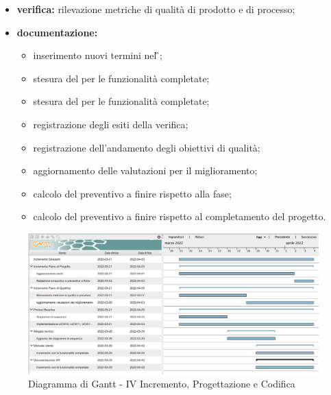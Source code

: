 \begin{itemize}
 	\item \textbf{verifica:} rilevazione metriche di qualità di prodotto e di processo;
	\item \textbf{documentazione:} 
	 \begin{itemize}
		\item inserimento nuovi termini nel \G{};
		\item stesura del \MU{} per le funzionalità completate;
		\item stesura del \MS{} per le funzionalità completate;
  		\item registrazione degli esiti della verifica;
     	\item registrazione dell’andamento degli obiettivi di qualità;
		\item aggiornamento delle valutazioni per il miglioramento; 
		\item calcolo del preventivo a finire rispetto alla fase;
		\item calcolo del preventivo a finire rispetto al completamento del progetto.
	 \end{itemize}
\end{itemize}
\begin{figure}[H]
	\centering
	\includegraphics[scale=0.35]{Sezioni/gantt/IV_incremento.png}
	\caption{Diagramma di Gantt - IV Incremento, Progettazione e Codifica}
\end{figure}

\pagebreak

